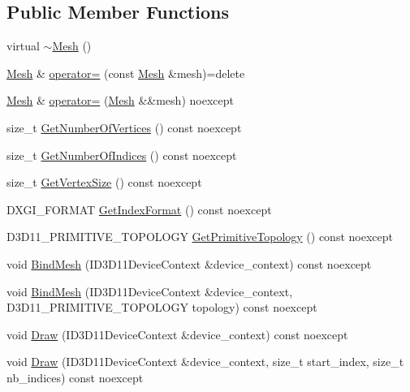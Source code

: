 \subsection*{Public Member Functions}
\begin{DoxyCompactItemize}
\item 
virtual \mbox{\hyperlink{classmage_1_1rendering_1_1_mesh_a3f0a53becc293987d7ecf9ca34a230d8}{$\sim$\+Mesh}} ()
\item 
\mbox{\hyperlink{classmage_1_1rendering_1_1_mesh}{Mesh}} \& \mbox{\hyperlink{classmage_1_1rendering_1_1_mesh_a17f6dd40e8eea41b469b475de93ee466}{operator=}} (const \mbox{\hyperlink{classmage_1_1rendering_1_1_mesh}{Mesh}} \&mesh)=delete
\item 
\mbox{\hyperlink{classmage_1_1rendering_1_1_mesh}{Mesh}} \& \mbox{\hyperlink{classmage_1_1rendering_1_1_mesh_ae5bcea1df4c9562bfe30cd247552fe1c}{operator=}} (\mbox{\hyperlink{classmage_1_1rendering_1_1_mesh}{Mesh}} \&\&mesh) noexcept
\item 
size\+\_\+t \mbox{\hyperlink{classmage_1_1rendering_1_1_mesh_a2c594e3c3b8e09bc20b35845ab46b6f3}{Get\+Number\+Of\+Vertices}} () const noexcept
\item 
size\+\_\+t \mbox{\hyperlink{classmage_1_1rendering_1_1_mesh_aaf8574345279790ca88d8acc5c2c85b6}{Get\+Number\+Of\+Indices}} () const noexcept
\item 
size\+\_\+t \mbox{\hyperlink{classmage_1_1rendering_1_1_mesh_a0fcc1a72aa5426ce9b020b580eb22a43}{Get\+Vertex\+Size}} () const noexcept
\item 
D\+X\+G\+I\+\_\+\+F\+O\+R\+M\+AT \mbox{\hyperlink{classmage_1_1rendering_1_1_mesh_a47540e1d5ec5d278862a3d0c0c5db1df}{Get\+Index\+Format}} () const noexcept
\item 
D3\+D11\+\_\+\+P\+R\+I\+M\+I\+T\+I\+V\+E\+\_\+\+T\+O\+P\+O\+L\+O\+GY \mbox{\hyperlink{classmage_1_1rendering_1_1_mesh_af6cead725f7e5352a90a8f8847580f75}{Get\+Primitive\+Topology}} () const noexcept
\item 
void \mbox{\hyperlink{classmage_1_1rendering_1_1_mesh_a36999cc548e68c3ad0c8d348ad0ead4f}{Bind\+Mesh}} (I\+D3\+D11\+Device\+Context \&device\+\_\+context) const noexcept
\item 
void \mbox{\hyperlink{classmage_1_1rendering_1_1_mesh_a35fe2a8fd609c204c70668e3a0a68331}{Bind\+Mesh}} (I\+D3\+D11\+Device\+Context \&device\+\_\+context, D3\+D11\+\_\+\+P\+R\+I\+M\+I\+T\+I\+V\+E\+\_\+\+T\+O\+P\+O\+L\+O\+GY topology) const noexcept
\item 
void \mbox{\hyperlink{classmage_1_1rendering_1_1_mesh_a4a29089e1894662029be09eafe32255b}{Draw}} (I\+D3\+D11\+Device\+Context \&device\+\_\+context) const noexcept
\item 
void \mbox{\hyperlink{classmage_1_1rendering_1_1_mesh_afc0c89379a7fe1040cf069105ee3520c}{Draw}} (I\+D3\+D11\+Device\+Context \&device\+\_\+context, size\+\_\+t start\+\_\+index, size\+\_\+t nb\+\_\+indices) const noexcept
\end{DoxyCompactItemize}
